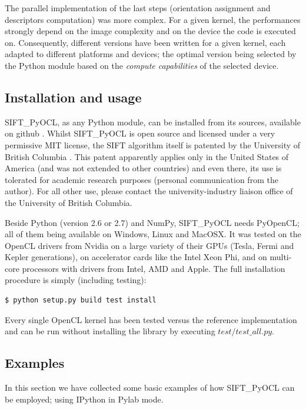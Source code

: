 \documentclass[preprint]{iucr}
\begin{document}
The parallel implementation of the last steps (orientation assignment and
descriptors computation) was more complex.
For a given kernel, the performances strongly depend on the image
complexity and on the device the code is executed on.
Consequently, different versions have been written for a given kernel, each
adapted to different platforms and
devices; the optimal version being selected by the
Python module based on the \emph{compute capabilities} of the selected device.


\subsection{Installation and usage}
SIFT\_PyOCL, as any Python module, can be installed from its sources,
available on github \cite{sift_pyocl}.
Whilst SIFT\_PyOCL is open source and licensed under a very
permissive MIT license, the SIFT algorithm itself is
patented by the University of British Columbia \cite{SIFT_pat}.
This patent apparently applies only in the United States of America
(and was not extended to other countries) and even there, its use is
tolerated for academic research purposes (personal communication from the
author). For all other use, please contact the university-industry liaison
office of the University of British Columbia.

Beside Python (version 2.6 or 2.7) and NumPy, SIFT\_PyOCL needs
PyOpenCL; all of them being available on Windows, Linux and MacOSX.
It was tested on the OpenCL drivers from Nvidia on a
large variety of their GPUs (Tesla, Fermi and Kepler generations), on
accelerator cards like the Intel Xeon Phi,  and on multi-core processors with
drivers from Intel, AMD and Apple.
The full installation procedure is simply (including testing):
\begin{verbatim}
$ python setup.py build test install
\end{verbatim}
Every single OpenCL kernel has been tested versus the reference
implementation and can be run without installing the library by
executing $test/test\_all.py$.

\subsection{Examples}

In this section we have collected some basic examples of how
SIFT\_PyOCL can be employed; using IPython \cite{ipython} in
Pylab \cite{matplotlib} mode.
\end{document}
